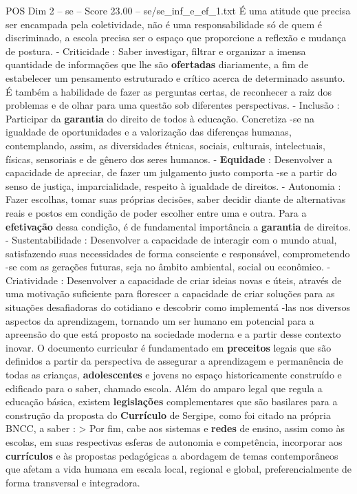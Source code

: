 \begin{textsample}{POS Dim 2 – se – Score 23.00 – se/se\_inf\_e\_ef\_1.txt}
É uma atitude que precisa ser encampada pela coletividade, não é uma responsabilidade só de quem é discriminado, a escola precisa ser o espaço que proporcione a reflexão e mudança de postura. - Criticidade : Saber investigar, filtrar e organizar a imensa quantidade de informações que lhe são \textbf{ofertadas} diariamente, a fim de estabelecer um pensamento estruturado e crítico acerca de determinado assunto.
É também a habilidade de fazer as perguntas certas, de reconhecer a raiz dos problemas e de olhar para uma questão sob diferentes perspectivas. - Inclusão : Participar da \textbf{garantia} do direito de todos à educação.
Concretiza -se na igualdade de oportunidades e a valorização das diferenças humanas, contemplando, assim, as diversidades étnicas, sociais, culturais, intelectuais, físicas, sensoriais e de gênero dos seres humanos. - \textbf{Equidade} : Desenvolver a capacidade de apreciar, de fazer um julgamento justo comporta -se a partir do senso de justiça, imparcialidade, respeito à igualdade de direitos. - Autonomia : Fazer escolhas, tomar suas próprias decisões, saber decidir diante de alternativas reais e postos em condição de poder escolher entre uma e outra.
Para a \textbf{efetivação} dessa condição, é de fundamental importância a \textbf{garantia} de direitos. - Sustentabilidade : Desenvolver a capacidade de interagir com o mundo atual, satisfazendo suas necessidades de forma consciente e responsável, comprometendo -se com as gerações futuras, seja no âmbito ambiental, social ou econômico. - Criatividade : Desenvolver a capacidade de criar ideias novas e úteis, através de uma motivação suficiente para florescer a capacidade de criar soluções para as situações desafiadoras do cotidiano e descobrir como implementá -las nos diversos aspectos da aprendizagem, tornando um ser humano em potencial para a apreensão do que está proposto na sociedade moderna e a partir desse contexto inovar.
O documento curricular é fundamentado em \textbf{preceitos} legais que são definidos a partir da perspectiva de assegurar a aprendizagem e permanência de todas as crianças, \textbf{adolescentes} e jovens no espaço historicamente construído e edificado para o saber, chamado escola.
Além do amparo legal que regula a educação básica, existem \textbf{legislações} complementares que são basilares para a construção da proposta do \textbf{Currículo} de Sergipe, como foi citado na própria BNCC, a saber : > Por fim, cabe aos sistemas e \textbf{redes} de ensino, assim como às escolas, em suas respectivas esferas de autonomia e competência, incorporar aos \textbf{currículos} e às propostas pedagógicas a abordagem de temas contemporâneos que afetam a vida humana em escala local, regional e global, preferencialmente de forma transversal e integradora.

\end{textsample}

